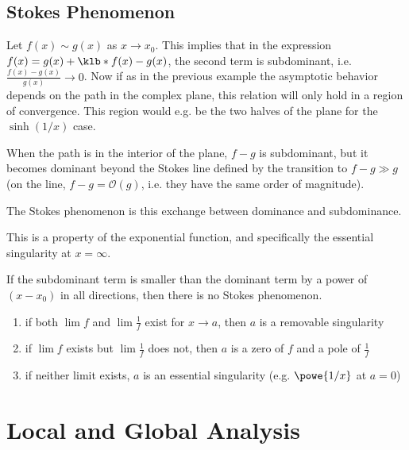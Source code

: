 \documentclass[english, parskip=full]{scrbook}
\newcommand{\definition}[2]{\begin{tcolorbox}[colback=colorbackgrounddefinition,colframe=colordefinition, breakable,enhanced,title=\textbf{#1}.]#2\end{tcolorbox}}
\newcommand{\note}[1]{\begin{tcolorbox}[colback=colorbackgroundnote,colframe=colornote, breakable,enhanced]#1\end{tcolorbox}}
\begin{document}
\section{Stokes Phenomenon}
\definition{Exchange of dominance and subdominance}{
Let $f(x)\sim g(x)$ as $x\rightarrow x_0$.
This implies that in the expression $f(x)=g(x)+\klb*{f(x)-g(x)}$, the second term is subdominant, i.e. $\frac{f(x)-g(x)}{g(x)} \rightarrow 0$.
Now if as in the previous example the asymptotic behavior depends on the path in the complex plane, this relation will only hold in a region of convergence.
This region would e.g. be the two halves of the plane for the $\sinh(1/x)$ case.

When the path is in the interior of the plane, $f-g$ is subdominant, but it becomes dominant beyond the Stokes line defined by the transition to $f-g\gg g$ (on the line, $f-g=\mathcal{O}(g)$, i.e. they have the same order of magnitude).

The Stokes phenomenon is this exchange between dominance and subdominance.
\note{
This is a property of the exponential function, and specifically the essential singularity at $x=\infty$.

If the subdominant term is smaller than the dominant term by a power of $(x-x_0)$ in all directions, then there is no Stokes phenomenon.
}
\note{
\begin{enumerate}
\item if both $\lim f$ and $\lim \frac{1}{f}$ exist for $x\rightarrow a$, then $a$ is a removable singularity
\item if $\lim f$ exists but $\lim \frac{1}{f}$ does not, then $a$ is a zero of $f$ and a pole of $\frac{1}{f}$
\item if neither limit exists, $a$ is an essential singularity (e.g. $\powe{1/x}$ at $a=0$)
\end{enumerate}
}
}
\chapter{Local and Global Analysis}
\end{document}
